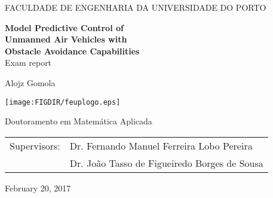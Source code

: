 \pagestyle{empty}
\begin{center}

{FACULDADE DE ENGENHARIA DA UNIVERSIDADE DO PORTO}

\vspace{3cm}
{\LARGE\bfseries Model Predictive Control of}
\vspace{0.2cm}\\
{\LARGE\bfseries Unmanned Air Vehicles with}
\vspace{0.2cm}\\
{\LARGE\bfseries Obstacle Avoidance Capabilities}
\vspace{1.2cm}\\
{\LARGE Exam report}

\vspace{1cm}
{\LARGE Alojz Gomola}


\vspace{5cm}
\centerline{\mbox{\texttt{[image: \\FIGDIR/feuplogo.eps]}}}


\vspace{2cm}
{\LARGE Doutoramento em Matemática Aplicada}

\vspace{1.5cm}
\begin{tabular}{rl}  
\noalign{\vspace{2mm}}
Supervisors: & Dr. Fernando Manuel Ferreira Lobo Pereira\\
\noalign{\vspace{2mm}}
& Dr. João Tasso de Figueiredo Borges de Sousa\\ 
\end{tabular}

\vspace{2cm}
{February 20, 2017}
\end{center}

\newpage
\openright

\pagestyle{plain}
\setcounter{page}{1}

\tableofcontents


\newpage
\listoffigures

\newpage
\listoftables